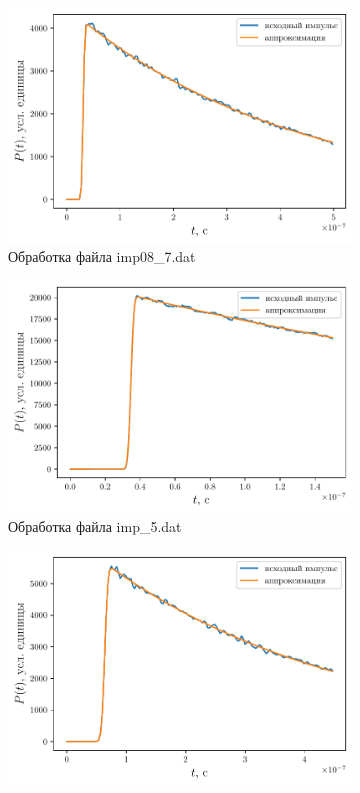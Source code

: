\begin{figure}[ht]
    \begin{subfigure}{0.5\linewidth}
        \centering
        \includegraphics[width=\linewidth]{fig/retracking/imp08_7_3}
        \caption{Обработка файла imp08\_7.dat}
        \label{fig:}
    \end{subfigure}
    \begin{subfigure}{0.5\linewidth}
        \centering
        \includegraphics[width=\linewidth]{fig/retracking/imp_5_3}
        \caption{Обработка файла imp\_5.dat}
        \label{fig:}
    \end{subfigure}
    \begin{subfigure}{0.5\linewidth}
        \centering
        \includegraphics[width=\linewidth]{fig/retracking/imp04_10_3}

\end{subfigure}
\end{figure}
